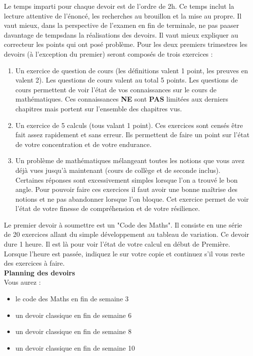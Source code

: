 \documentclass[12pt,fleqn]{report} %
\begin{document}
Le temps imparti pour chaque devoir est de l’ordre de 2h. Ce temps inclut la lecture attentive de l'énoncé, les recherches au brouillon et la mise au propre. Il vaut mieux, dans la perspective de l’examen en fin de terminale, ne pas paaser davantage de tempsdans la réalisations des devoirs. Il vaut mieux expliquer au correcteur les points qui ont posé problème. Pour les deux premiers trimestres les devoirs (à l'exception du premier) seront composés de trois exercices : 
\begin{enumerate}
	\item Un exercice de question de cours (les définitions valent 1 point, les preuves en valent 2). Les questions de cours valent au total 5 points. Les questions de cours permettent de voir l'état de vos connaissances sur le cours de mathématiques. Ces connaissances \textbf{NE} sont \textbf{PAS} limitées aux derniers chapitres mais portent sur l'ensemble des chapitres vus.
	\item Un exercice de 5 calculs (tous valant 1 point). Ces exercices sont censés être fait assez rapidement et sans erreur. Ils permettent de faire un point sur l'état de votre concentration et de votre endurance.
	\item Un problème de mathématiques mélangeant toutes les notions que vous avez déjà vues jusqu'à maintenant (cours de collège et de seconde inclus). Certaines réponses sont excessivement simples lorsque l'on a trouvé le bon angle. Pour pouvoir faire ces exercices il faut avoir une bonne maîtrise des notions et ne pas abandonner lorsque l'on bloque. Cet exercice permet de voir l'état de votre finesse de compréhension et de votre résilience.
\end{enumerate}
\vspace{10pt}
Le premier devoir à soumettre est un "Code des Maths". Il consiste en une série de 20 exercices allant du simple développement au tableau de variation. Ce devoir dure 1 heure. Il est là pour voir l'état de votre calcul en début de Première. Lorsque l'heure est passée, indiquez le sur votre copie et continuez s'il vous reste des exercices à faire. \vspace{20pt}\\

\textbf{Planning des devoirs}\\
Vous aurez : \begin{itemize}
	\item le code des Maths en fin de semaine 3
	\item un devoir classique en fin de semaine 6
	\item un devoir classique en fin de semaine 8
	\item un devoir classique en fin de semaine 10
\end{itemize}\vspace{2pt}
\end{document}
